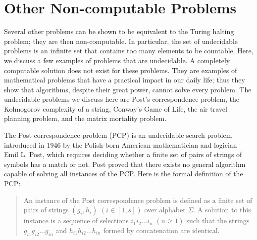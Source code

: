 \section{\label{sec:11.2}Other Non-computable Problems}

Several other problems can be shown to be equivalent to the Turing halting problem; they are then non-computable. In particular, the set of undecidable problems is an infinite set that contains too many elements to be countable. Here, we discuss a few examples of problems that are undecidable. A completely computable solution does not exist for these problems. They are examples of mathematical problems that have a practical impact in our daily life; thus they show that algorithms, despite their great power, cannot solve every problem. The undecidable problems we discuss here are Post's correspondence problem, the Kolmogorov complexity of a string, Conway's Game of Life, the air travel planning problem, and the matrix mortality problem.

The Post correspondence problem (PCP) is an undecidable search problem introduced in 1946 by the Polish-born American mathematician and logician Emil L. Post, which requires deciding whether a finite set of pairs of strings of symbols has a match or not. Post proved that there exists no general algorithm capable of solving all instances of the PCP. Here is the formal definition of the PCP:

\begin{quote}
An instance of the Post correspondence problem is defined as a finite set of pairs of strings $(g_{i},h_{i})$ $(i \in [1,s])$ over alphabet $\Sigma$. A solution to this instance is a sequence of selections $i_{1}i_{2}\ldots i_{n}$ $(n \geq 1)$ such that the strings $g_{i1}g_{i2}\ldots g_{in}$ and $h_{i1}h_{i2}\ldots h_{in}$ formed by concatenation are identical.
\end{quote}

